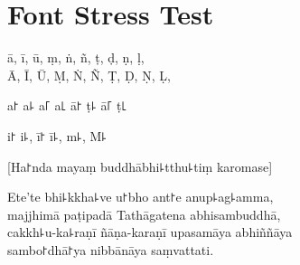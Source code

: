 \chapter{Font Stress Test}

ā, ī, ū, ṃ, ṅ, ñ, ṭ, ḍ, ṇ, ḷ,\\
Ā, Ī, Ū, Ṃ, Ṅ, Ñ, Ṭ, Ḍ, Ṇ, Ḷ,

a꜓ a꜕ a꜒ a꜖ ā꜓ ṭ꜕ ā꜒ ṭ꜖

i꜓ i꜕, ī꜓ ī꜕, m꜕, M꜕

[Ha꜓nda mayaṃ buddhābhi꜕tthu꜕tiṃ karomase]

Ete'te bhi꜕kkha꜕ve u꜓bho ant꜓e anup꜕ag꜕amma,\\
majjhimā paṭipadā Tathāgatena abhisambuddhā,\\
cakkh꜕u-ka꜕raṇī ñāṇa-karaṇī upasamāya abhiññāya\\
sambo꜓dhā꜓ya nibbānāya saṃvattati.

